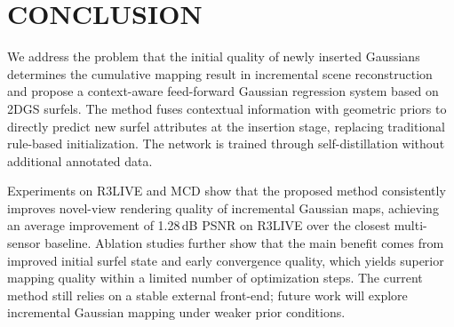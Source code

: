 \documentclass[letterpaper, 10pt, conference]{ieeeconf}
\begin{document}
\section{CONCLUSION}

We address the problem that the initial quality of newly inserted Gaussians determines the cumulative mapping result in incremental scene reconstruction and propose a context-aware feed-forward Gaussian regression system based on 2DGS surfels. The method fuses contextual information with geometric priors to directly predict new surfel attributes at the insertion stage, replacing traditional rule-based initialization. The network is trained through self-distillation without additional annotated data.

Experiments on R3LIVE and MCD show that the proposed method consistently improves novel-view rendering quality of incremental Gaussian maps, achieving an average improvement of 1.28\,dB PSNR on R3LIVE over the closest multi-sensor baseline. Ablation studies further show that the main benefit comes from improved initial surfel state and early convergence quality, which yields superior mapping quality within a limited number of optimization steps. The current method still relies on a stable external front-end; future work will explore incremental Gaussian mapping under weaker prior conditions.





\end{document}
